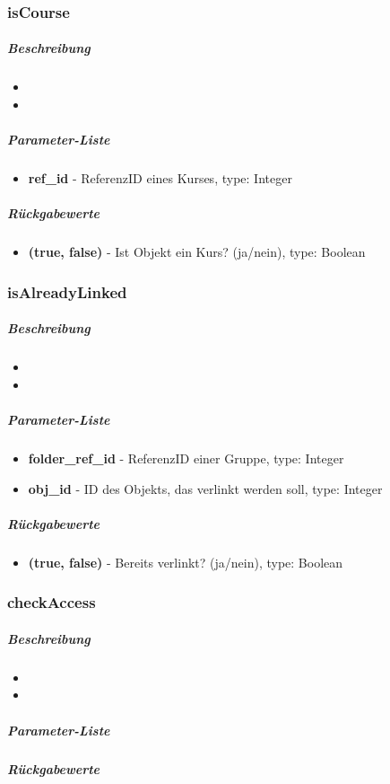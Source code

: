 \subsubsection*{isCourse}\label{isCourseLGUI}
\subparagraph{Beschreibung}
\begin{itemize}
	\item[] \noindent{} 
	\item[] 
\end{itemize}
\subparagraph{Parameter-Liste}
\begin{itemize}
	\item[] \textbf{ref\_id} - ReferenzID eines Kurses, type: Integer
\end{itemize}
\subparagraph{Rückgabewerte}
\begin{itemize}
	\item[] \textbf{(true, false)} - Ist Objekt ein Kurs? (ja/nein), type: Boolean
\end{itemize}

\subsubsection*{isAlreadyLinked}\label{isAlreadyLinkedLGUI}
\subparagraph{Beschreibung}
\begin{itemize}
	\item[] \noindent{} 
	\item[] 
\end{itemize}
\subparagraph{Parameter-Liste}
\begin{itemize}
	\item[] \textbf{folder\_ref\_id} - ReferenzID einer Gruppe, type: Integer
	\item[] \textbf{obj\_id} - ID des Objekts, das verlinkt werden soll, type: Integer
\end{itemize}
\subparagraph{Rückgabewerte}
\begin{itemize}
	\item[] \textbf{(true, false)} - Bereits verlinkt? (ja/nein), type: Boolean
\end{itemize}

\subsubsection*{checkAccess}\label{checkAccessLGUI}
\subparagraph{Beschreibung}
\begin{itemize}
	\item[] \noindent{} 
	\item[] 
\end{itemize}
\subparagraph{Parameter-Liste}
\subparagraph{Rückgabewerte}